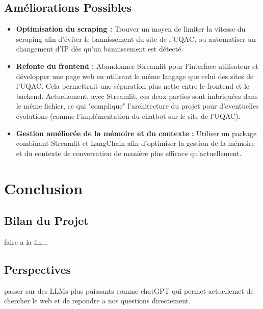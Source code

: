 \documentclass{article}
\begin{document}
\subsection{Améliorations Possibles}
\begin{itemize}
    \item \textbf{Optimisation du scraping :}  
    Trouver un moyen de limiter la vitesse du scraping afin d'éviter le bannissement du site de l'UQAC, ou automatiser un changement d'IP dès qu'un bannissement est détecté.
    
    \item \textbf{Refonte du frontend :}  
    Abandonner Streamlit pour l'interface utilisateur et développer une page web en utilisant le même langage que celui des sites de l'UQAC. Cela permettrait une séparation plus nette entre le frontend et le backend. Actuellement, avec Streamlit, ces deux parties sont imbriquées dans le même fichier, ce qui "complique" l'architecture du projet pour d'eventuelles évolutions (comme l'implémentation du chatbot sur le site de l'UQAC).
    
    \item \textbf{Gestion améliorée de la mémoire et du contexte :}  
    Utiliser un package combinant Streamlit et LangChain afin d'optimiser la gestion de la mémoire et du contexte de conversation de manière plus efficace qu'actuellement.
\end{itemize}


\clearpage

\section{Conclusion}
\subsection{Bilan du Projet}
faire a la fin...
\subsection{Perspectives}
passer sur des LLMs plus puissants comme chatGPT qui permet actuellemet de chercher le web et de repondre a nos questions directement.
\end{document}
